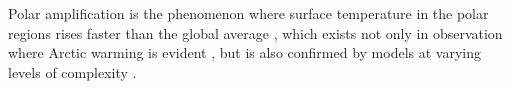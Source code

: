 

 

Polar amplification is the phenomenon where surface temperature in the polar regions rises faster than the global average \citep{IPCC2007Synth,Stocker2013}, which exists not only in observation where Arctic warming is evident \citep{Johannessen2004,Polyakov2002}, but is also confirmed by models at varying levels of complexity \citep[e.g.,][]{Winton2006amplified,Langen2007,Merlis2018,Alexeev2005}.

